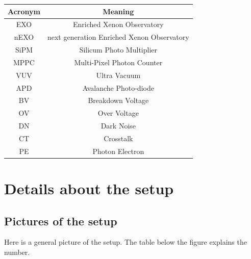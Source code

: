 \documentclass[a4paper, 11pt]{report}%
\begin{document}
  \begin{tabular}{|c|c|}
    \hline
    \bf Acronym & \bf Meaning\\
    \hline
    \hline
    EXO & Enriched Xenon Observatory\\
    \hline
    nEXO & next generation Enriched Xenon Observatory\\
    \hline
    SiPM & Silicum Photo Multiplier\\
    \hline
    MPPC & Multi-Pixel Photon Counter\\
    \hline
    VUV & Ultra Vacuum \\
    \hline
    APD & Avalanche Photo-diode \\
    \hline
    BV & Breakdown Voltage \\
    \hline
    OV & Over Voltage\\
    \hline
    DN & Dark Noise\\
    \hline
    CT & Crosstalk \\
    \hline
    PE & Photon Electron \\
    \hline
    \hline
  \end{tabular}



\chapter{Details about the setup}\label{app:setup}

  \section{Pictures of the setup}
  
  Here is a general picture of the setup. The table below the figure explains the number. 
  
\end{document}
